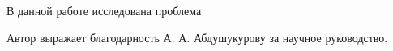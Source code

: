     В данной работе исследована проблема 
    
    Автор выражает благодарность А. А. Абдушукурову за научное руководство.